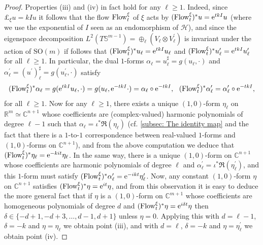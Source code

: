 \documentclass{article}
\numberwithin{equation}{section}        %
\theoremstyle{bfnote}
\theoremstyle{definition}
\theoremstyle{bfremark}
\newcommand{\R}{\mathbb{R}}                 %
\newcommand{\C}{\mathbb{C}}                 %
\newcommand{\Sp}{\mathbb{S}}                %
\begin{document}
\begin{proof}
    Properties (iii) and (iv) in fact hold for any $\ell \geq 1$. Indeed, since $\pounds_\xi u = k Iu$ it follows that the flow $\textup{Flow}_{t}^\xi$ of $\xi$ acts by $(\textup{Flow}_{t}^\xi)^* u = \mathrm{e}^{tkI} u$ (where we use the exponential of $I$ seen as an endomorphism of $\mathscr H$), and since the eigenspace decomposition $L^2(T\Sp^{m-1}) = \oplus_\ell (V_\ell \otimes V^\prime_\ell)$ is invariant under the action of $\mathrm{SO}(m)$ if follows that $(\textup{Flow}_{t}^\xi)^* u_\ell = \mathrm{e}^{tkI} u_\ell$ and $(\textup{Flow}_{t}^\xi)^* u^\prime_\ell = \mathrm{e}^{tkI} u^\prime_\ell$ for all $\ell \geq 1$. In particular, the dual $1$-forms $\alpha_\ell = u^\sharp_\ell = g(u_\ell,\cdot)$ and $\alpha^\prime_\ell = (u^\prime)^\sharp_\ell = g(u^\prime_\ell,\cdot)$ satisfy
    \begin{equation*}
        (\textup{Flow}_{t}^\xi)^* \alpha_\ell = g(\mathrm{e}^{tkI} u_\ell,\cdot) = g(u_\ell, \mathrm{e}^{-tkI} \cdot) =  \alpha_\ell  \circ \mathrm{e}^{-tkI}, ~~ (\textup{Flow}_{t}^\xi)^* \alpha^\prime_\ell = \alpha^\prime_\ell  \circ \mathrm{e}^{-tkI},
    \end{equation*}
    for all $\ell \geq 1$. Now for any $\ell \geq 1$, there exists a unique $(1,0)$-form $\eta_\ell$ on $\R^m \simeq \C^{n+1}$ whose coefficients are (complex-valued) harmonic polynomials of degree $\ell-1$ such that $\alpha_\ell = \iota^* \Re(\eta_\ell)$ (cf. \cref{subsec: The identity map} and the fact that there is a $1$-to-$1$ correspondence between real-valued $1$-forms and $(1,0)$-forms on $\C^{n+1}$), and from the above computation we deduce that $(\textup{Flow}_{t}^\xi)^* \eta_\ell = \mathrm{e}^{-kit} \eta_\ell$. In the same way, there is a unique $(1,0)$-form on $\C^{n+1}$ whose coefficients are harmonic polynomials of degree $\ell$ and $\alpha^\prime_\ell = \iota^* \Re(\eta^\prime_\ell)$, and this $1$-form must satisfy $(\textup{Flow}_{t}^\xi)^*\alpha^\prime_\ell = \mathrm{e}^{-ikt} \eta^\prime_\ell$. Now, any constant $(1,0)$-form $\eta$ on $\C^{n+1}$ satisfies $(\textup{Flow}_{t}^\xi)^* \eta = \mathrm{e}^{it} \eta$, and from this observation it is easy to deduce the more general fact that if $\eta$ is a $(1,0)$-form on $\C^{m+1}$ whose coefficients are homogeneous polynomials of degree $d$ and $(\textup{Flow}_{t}^\xi)^*\eta = \mathrm{e}^{i\delta t} \eta$ then $\delta \in \{-d+1,-d+3,\ldots,d-1,d+1\}$ unless $\eta = 0$. Applying this with $d = \ell-1$, $\delta = -k$ and $\eta = \eta_\ell$ we obtain point (iii), and with $d = \ell$, $\delta = -k$ and $\eta = \eta^\prime_\ell$ we obtain point (iv).


\end{proof}
\end{document}

